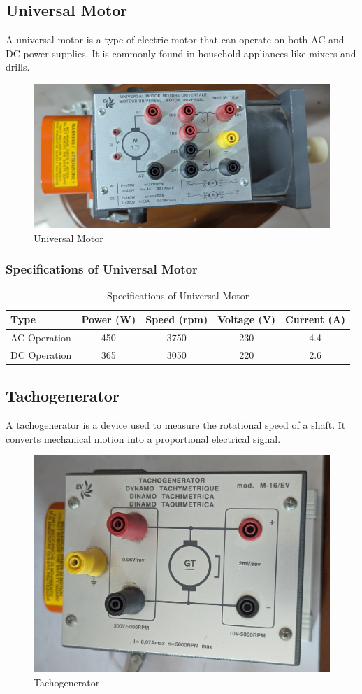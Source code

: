 \documentclass[a4paper,12pt]{article}
\begin{document}
	\newpage
	\subsection{Universal Motor}
	A universal motor is a type of electric motor that can operate on both AC and DC power supplies. It is commonly found in household appliances like mixers and drills.
	\begin{figure}[H]
		\centering
		\includegraphics[width=.7\linewidth, height=0.2\textheight]{"Images/9"}
		\caption{Universal Motor}
	\end{figure}
	\subsubsection{Specifications of Universal Motor}
	\begin{table}[h]
		\centering
		\caption{Specifications of Universal Motor}
		\begin{tabular}{|l|c|c|c|c|}
				\hline
			\textbf{Type} & \textbf{Power (W)} & \textbf{Speed (rpm)} & \textbf{Voltage (V)} & \textbf{Current (A)} \\
			\hline
			AC Operation  & 450  & 3750  & 230  & 4.4  \\ 	\hline
			DC Operation  & 365  & 3050  & 220  & 2.6  \\ 	\hline
		
		\end{tabular}
		\label{tab:universal_motor_specs}
	\end{table}
	\subsection{Tachogenerator}
	A tachogenerator is a device used to measure the rotational speed of a shaft. It converts mechanical motion into a proportional electrical signal.
		\begin{figure}[H]
		\centering
		\includegraphics[width=.5\linewidth, height=0.2\textheight]{"Images/13"}
		\caption{Tachogenerator}
	\end{figure}
	
\end{document}
